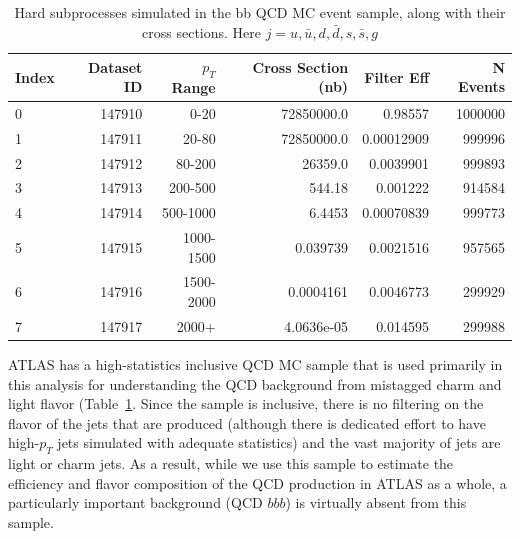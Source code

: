 \begin{table}[h]
 \begin{center}
\caption{Hard subprocesses simulated in the bb QCD MC event sample, along with their cross sections. Here
$j=u,\bar{u},d,\bar{d},s,\bar{s},g$
\label{tab:qcd_mc_parameters}}
    \begin{tabular}{l r r r r r} \hline \hline
    Index & Dataset ID & $p_T$ Range& Cross Section (nb)& Filter Eff   & N Events \\ \hline
    0     &  147910    & 0-20        &  72850000.0       &      0.98557 & 1000000 \\
    1     &  147911    & 20-80       &  72850000.0       &   0.00012909 & 999996  \\
    2     &  147912    & 80-200      &     26359.0       &    0.0039901 & 999893 \\
    3     &  147913    & 200-500     &      544.18       &     0.001222 & 914584 \\
    4     &  147914    & 500-1000    &      6.4453       &   0.00070839 & 999773 \\
    5     &  147915    & 1000-1500   &    0.039739       &    0.0021516 & 957565 \\
    6     &  147916    & 1500-2000   &   0.0004161       &    0.0046773 & 299929 \\
    7     &  147917    & 2000+       &  4.0636e-05       &     0.014595 & 299988 \\
    \end{tabular}
  \end{center}
\end{table}

ATLAS has a high-statistics inclusive QCD MC sample that is used primarily in 
this analysis for understanding the QCD background from 
mistagged charm and light flavor (Table~\ref{tab:qcd_mc_parameters}.  Since 
the sample is inclusive, there is no filtering on the flavor of the jets 
that are produced (although there is dedicated effort to have high-$p_T$ 
jets simulated with adequate statistics) and the vast majority of jets are light or 
charm jets.  As a result, while we use this sample to estimate the 
efficiency and flavor composition of the QCD production in ATLAS as a whole, a 
particularly important background (QCD $bbb$) is virtually absent from this sample.


